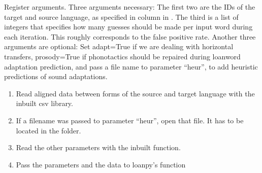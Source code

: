 \documentclass[letterpaper,10pt,english]{sphinxmanual}
\begin{document}
{{{{\begin{fulllineitems}
\label{\detokenize{mkloanpy:ronataswestoldturkiccommands.evalsc.register}}
\pysigstartsignatures
{}
\pysigstopsignatures
\sphinxAtStartPar
Register arguments. Three arguments necessary: The first two are the IDs
of the target and source language, as specified in column  in
. The third is a list of integers that specifies
how many guesses should be made per input word during each iteration.
This roughly corresponds to the false positive rate. Another three
arguments are optional: Set adapt=True if we are dealing with horizontal
transfers, prosody=True if phonotactics should be repaired during
loanword adaptation prediction, and pass a file name to parameter “heur”,
to add heuristic predictions of sound adaptations.

\end{fulllineitems}


\begin{fulllineitems}
\label{\detokenize{mkloanpy:ronataswestoldturkiccommands.evalsc.run}}
\pysigstartsignatures
{}
\pysigstopsignatures\begin{enumerate}
%
\item {} 
\sphinxAtStartPar
Read aligned data between forms of the source and target language
with the inbuilt csv library.

\item {} 
\sphinxAtStartPar
If a filename was passed to parameter “heur”, open that file. It has
to be located in the  folder.

\item {} 
\sphinxAtStartPar
Read the other parameters with the inbuilt  function.

\item {} 
\sphinxAtStartPar
Pass the parameters and the data to loanpy’s 
function


\end{enumerate}
\end{fulllineitems}}}}}
\end{document}
